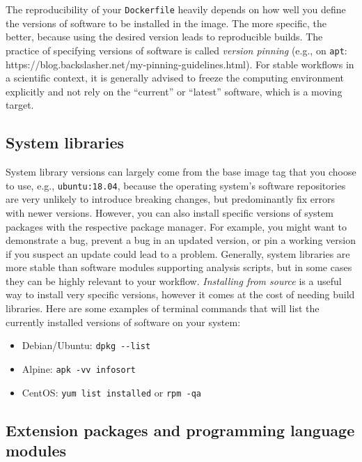 \documentclass[10pt,letterpaper]{article}
\providecommand{\tightlist}{%
  \setlength{\itemsep}{0pt}\setlength{\parskip}{0pt}}
\begin{document}
  \label{rule:pinning} 

The reproducibility of your \texttt{Dockerfile} heavily depends on how
well you define the versions of software to be installed in the image.
The more specific, the better, because using the desired version leads
to reproducible builds. The practice of specifying versions of software
is called \emph{version pinning} (e.g., on \texttt{apt}:
https://blog.backslasher.net/my-pinning-guidelines.html). For stable
workflows in a scientific context, it is generally advised to freeze the
computing environment explicitly and not rely on the ``current'' or
``latest'' software, which is a moving target.

\hypertarget{system-libraries}{%
\subsection{System libraries}\label{system-libraries}}

System library versions can largely come from the base image tag that
you choose to use, e.g., \texttt{ubuntu:18.04}, because the operating
system's software repositories are very unlikely to introduce breaking
changes, but predominantly fix errors with newer versions. However, you
can also install specific versions of system packages with the
respective package manager. For example, you might want to demonstrate a
bug, prevent a bug in an updated version, or pin a working version if
you suspect an update could lead to a problem. Generally, system
libraries are more stable than software modules supporting analysis
scripts, but in some cases they can be highly relevant to your workflow.
\emph{Installing from source} is a useful way to install very specific
versions, however it comes at the cost of needing build libraries. Here
are some examples of terminal commands that will list the currently
installed versions of software on your system:

\begin{itemize}
\tightlist
\item
  Debian/Ubuntu: \texttt{dpkg\ -\/-list}
\item
  Alpine: \texttt{apk\ -vv\ info\textbar{}sort}
\item
  CentOS: \texttt{yum\ list\ installed} or \texttt{rpm\ -qa}
\end{itemize}

\hypertarget{extension-packages-and-programming-language-modules}{%
\subsection{Extension packages and programming language
modules}\label{extension-packages-and-programming-language-modules}}
\end{document}
